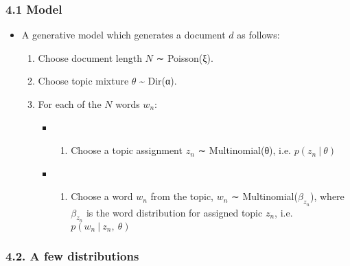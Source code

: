 \documentclass[11pt]{article}
\providecommand{\tightlist}{%
      \setlength{\itemsep}{0pt}\setlength{\parskip}{0pt}}
\begin{document}
\hypertarget{model}{%
\subsubsection{4.1 Model}\label{model}}

\begin{itemize}
\tightlist
\item
  A generative model which generates a document \(d\) as follows:

  \begin{enumerate}
  \def\labelenumi{\arabic{enumi}.}
  \tightlist
  \item
    Choose document length \(N\) ∼ Poisson(ξ).
  \item
    Choose topic mixture \(\theta\) \textasciitilde{} Dir(α).
  \item
    For each of the \(N\) words \(w_n\):

    \begin{itemize}
    \item
      \begin{enumerate}
      \def\labelenumii{(\alph{enumii})}
      \tightlist
      \item
        Choose a topic assignment \(z_n\) ∼ Multinomial(θ), i.e.
        \(p(z_n~|~\theta)\)
      \end{enumerate}
    \item
      \begin{enumerate}
      \def\labelenumii{(\alph{enumii})}
      \setcounter{enumii}{1}
      \tightlist
      \item
        Choose a word \(w_n\) from the topic, \(w_n\) ∼
        Multinomial(\(\beta_{z_n}\)), where \(\beta_{z_n}\) is the word
        distribution for assigned topic \(z_n\), i.e.
        \(p(w_n~|~z_n, ~\theta)\)
      \end{enumerate}
    \end{itemize}
  \end{enumerate}
\end{itemize}

    \hypertarget{a-few-distributions}{%
\subsubsection{4.2. A few distributions}\label{a-few-distributions}}
\end{document}
